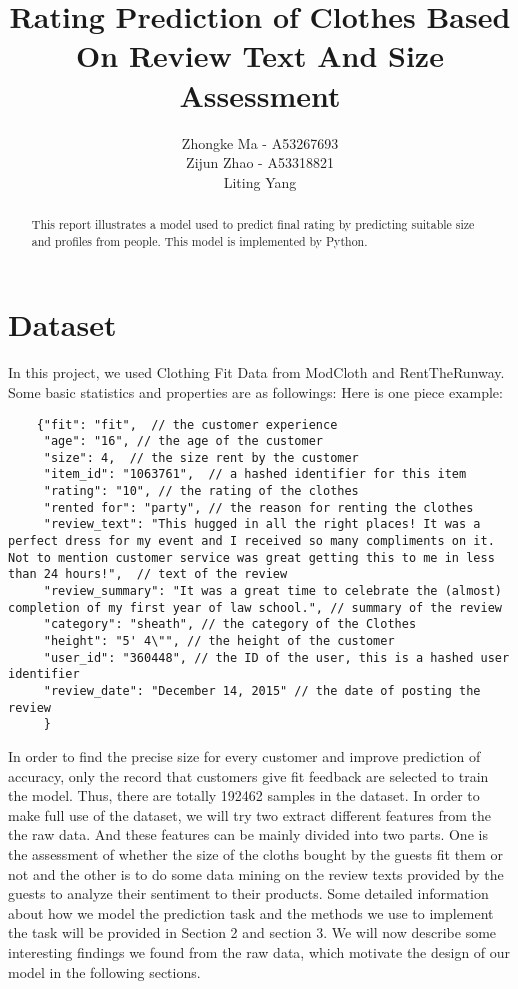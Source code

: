 \documentclass[letterpaper, 10 pt, conference]{ieeeconf}  %
\title{\LARGE \bf
Rating Prediction of Clothes Based On Review Text And Size Assessment
}
\author{Zhongke Ma - A53267693%
	\\Zijun Zhao - A53318821%
	\\Liting Yang 
	
}
\begin{document}
\maketitle
\thispagestyle{empty}
\pagestyle{empty}


\begin{abstract}

This report illustrates a model used to predict final rating by predicting suitable size and profiles from people. This model is implemented by Python.

\end{abstract}


\section{Dataset}
	
	In this project, we used Clothing Fit Data from ModCloth and RentTheRunway. Some basic statistics and properties are as followings:
	Here is one piece example:

	\lstset{language=C}
	\begin{lstlisting}
	{"fit": "fit",  // the customer experience
	 "age": "16", // the age of the customer
	 "size": 4,  // the size rent by the customer
	 "item_id": "1063761",  // a hashed identifier for this item 
	 "rating": "10", // the rating of the clothes
	 "rented for": "party", // the reason for renting the clothes
	 "review_text": "This hugged in all the right places! It was a perfect dress for my event and I received so many compliments on it. Not to mention customer service was great getting this to me in less than 24 hours!",  // text of the review
	 "review_summary": "It was a great time to celebrate the (almost) completion of my first year of law school.", // summary of the review
	 "category": "sheath", // the category of the Clothes
	 "height": "5' 4\"", // the height of the customer
	 "user_id": "360448", // the ID of the user, this is a hashed user identifier 
	 "review_date": "December 14, 2015" // the date of posting the review
	 }
	\end{lstlisting}
	
	In order to find the precise size for every customer and improve prediction of accuracy, only the record that customers give fit feedback are selected to train the model. Thus, there are totally 192462 samples in the dataset. 
	In order to make full use of the dataset, we will try two extract different features from the the raw data. And these features can be mainly divided into two parts. One is the assessment of whether the size of the cloths bought by the guests fit them or not and the other is to do some data mining on the review texts provided by the guests to analyze their sentiment to their products. Some detailed information about how we model the prediction task and the methods we use to implement the task will be provided in Section 2 and section 3. We will now describe some interesting findings we found from the raw data, which motivate the design of our model in the following sections.
	
\end{document}
